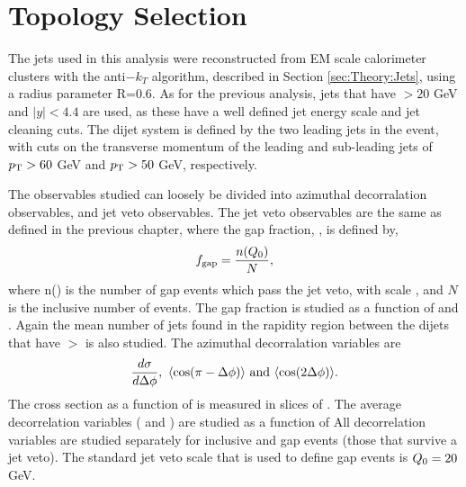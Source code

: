 \section{Topology Selection}
\label{sec:GBJ2:AnalSel}
The jets used in this analysis were reconstructed from EM scale calorimeter clusters with the anti$-k_T$ algorithm, described in Section \ref{sec:Theory:Jets}, using a radius parameter R=0.6.
As for the previous analysis, jets that have \pt{}$>20$ GeV and $|y|<4.4$ are used, as these have a well defined jet energy scale and jet cleaning cuts.
The dijet system is defined by the two leading jets in the event, with cuts on the transverse momentum of the leading and sub-leading jets of $\mbox{$p_{\rm T}$}{}>60$ GeV and $\mbox{$p_{\rm T}$}{}>50$ GeV, respectively.



The observables studied can loosely be divided into azimuthal decorralation observables, and jet veto observables.
The jet veto observables are the same as defined in the previous chapter, where the gap fraction, \gap{}, is defined by,
\begin{equation}
f_{\rm gap} = \frac{n (\mbox{$Q_0$}{})}{N},
\label{GBJ2:fgap}
\end{equation}
where n(\qz{}) is the number of gap events which pass the jet veto, with scale \qz{}, and $N$ is the inclusive number of events.
The gap fraction is studied as a function of \dy{} and \qz{}.
Again the mean number of jets found in the rapidity region between the dijets \nb{} that have \pt{}$>$\qz{} is also studied. 
The azimuthal decorralation variables are
\begin{equation}
\frac{d\sigma}{d\Delta\phi},~\mbox{$\langle \mbox{$\rm cos(\pi - \mbox{$\Delta{\rm \phi}$}{})$} \rangle$}~\rm{and}~\mbox{$\langle \mbox{$\rm cos(2\mbox{$\Delta{\rm \phi}$}{}) $} \rangle$}.
\label{GBJ2:AZVar}
\end{equation}
The cross section as a function of \dphi{} is measured in slices of \dy{}.
The average decorrelation variables (\mean{\cosdphi} and \mean{\costwodphi})  are studied as a function of \dy{}
All decorrelation variables are studied separately for inclusive and gap events (those that survive a jet veto).
The standard jet veto scale that is used to define gap events is $\mbox{$Q_0$}{}=20$ GeV.


